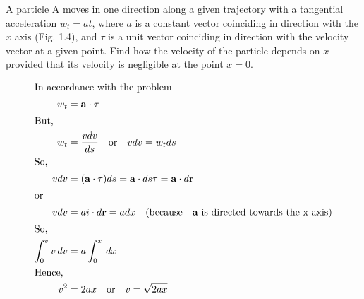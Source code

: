 
\item A particle A moves in one direction along a given trajectory with a tangential acceleration \( w_t = at \), where \( a \) is a constant vector coinciding in direction with the \( x \) axis (Fig. 1.4), and \( \tau \) is a unit vector coinciding in direction with the velocity vector at a given point. Find how the velocity of the particle depends on \( x \) provided that its velocity is negligible at the point \( x = 0 \).

\begin{solution}
    \begin{align*}
        \intertext{In accordance with the problem}
        w_t &= \mathbf{a} \cdot \tau\\
        \intertext{But,}
        w_t &= \frac{vdv}{ds} \quad \text{or} \quad vdv = w_t ds\\
        \intertext{So,}
        vdv &= (\mathbf{a} \cdot \tau) ds = \mathbf{a} \cdot ds \tau = \mathbf{a} \cdot d \mathbf{r}\\
        \intertext{or}
        vdv &= a i \cdot d \mathbf{r} = adx \quad \text{(because} \quad \mathbf{a} \text{ is directed towards the x-axis)}\\
        \intertext{So,}
        \int_0^v v \, dv &= a \int_0^x \, dx\\
        \intertext{Hence,}
        v^2 &= 2ax \quad \text{or} \quad v = \sqrt{2ax}
    \end{align*}
\end{solution}
